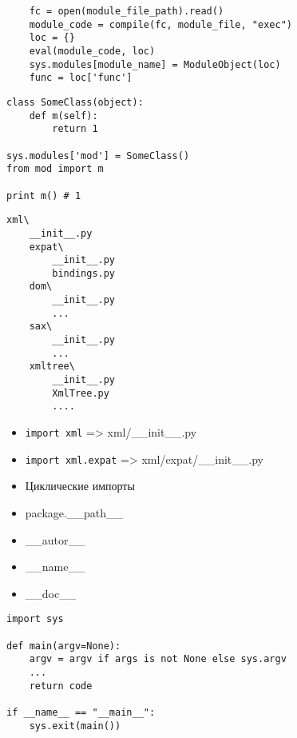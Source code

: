 \documentclass{article}
\begin{document}
{
\LARGE \vspace{15pt}
\begin{lstlisting}
	fc = open(module_file_path).read()
	module_code = compile(fc, module_file, "exec")
	loc = {}
	eval(module_code, loc)
	sys.modules[module_name] = ModuleObject(loc)
	func = loc['func']
\end{lstlisting}
}
\newpage

{
\LARGE \vspace{15pt}
\begin{lstlisting}
class SomeClass(object):
	def m(self):
		return 1

sys.modules['mod'] = SomeClass()
from mod import m

print m() # 1
\end{lstlisting}
}

\newpage
\begin{verbatim}
xml\
	__init__.py
    expat\
        __init__.py
        bindings.py
    dom\
        __init__.py
        ...
    sax\
        __init__.py
        ...
    xmltree\
    	__init__.py
    	XmlTree.py
    	....
\end{verbatim}
\newpage

\begin{itemize}
	\item \lstinline!import xml! => xml/\_\_init\_\_.py
	\item \lstinline!import xml.expat! => xml/expat/\_\_init\_\_.py
	\item Циклические импорты
	\item package.\_\_path\_\_
\end{itemize}
\newpage

\center{}
\begin{itemize}
	\item \_\_autor\_\_
	\item \_\_name\_\_
	\item \_\_doc\_\_
\end{itemize}

{
\LARGE \vspace{15pt}
\begin{lstlisting}
import sys

def main(argv=None):
	argv = argv if args is not None else sys.argv
	...
	return code

if __name__ == "__main__":
	sys.exit(main())

\end{lstlisting}
}
\end{document}
